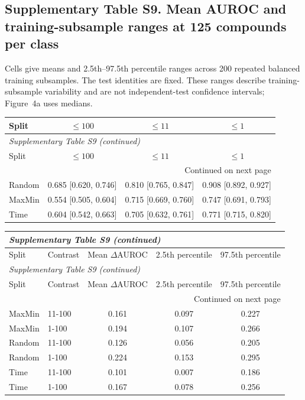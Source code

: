 \subsection*{Supplementary Table S9. Mean AUROC and training-subsample ranges at 125 compounds per class}
Cells give means and 2.5th--97.5th percentile ranges across 200 repeated balanced training subsamples. The test identities are fixed. These ranges describe training-subsample variability and are not independent-test confidence intervals; Figure~4a uses medians.
\begin{longtable}{lccc}

\toprule Split & $\leq100$ & $\leq11$ & $\leq1$ \\ \midrule\endfirsthead
\multicolumn{4}{l}{\textit{Supplementary Table S9 (continued)}} \\
\toprule Split & $\leq100$ & $\leq11$ & $\leq1$ \\ \midrule\endhead
\midrule\multicolumn{4}{r}{Continued on next page}\\\endfoot
\bottomrule\endlastfoot
Random & 0.685 [0.620, 0.746] & 0.810 [0.765, 0.847] & 0.908 [0.892, 0.927] \\
MaxMin & 0.554 [0.505, 0.604] & 0.715 [0.669, 0.760] & 0.747 [0.691, 0.793] \\
Time & 0.604 [0.542, 0.663] & 0.705 [0.632, 0.761] & 0.771 [0.715, 0.820] \\
\end{longtable}
\begin{longtable}{llccc}
\multicolumn{5}{l}{\textit{Supplementary Table S9 (continued)}} \\
\toprule Split & Contrast & Mean $\Delta$AUROC & 2.5th percentile & 97.5th percentile \\ \midrule\endfirsthead
\multicolumn{5}{l}{\textit{Supplementary Table S9 (continued)}} \\
\toprule Split & Contrast & Mean $\Delta$AUROC & 2.5th percentile & 97.5th percentile \\ \midrule\endhead
\midrule\multicolumn{5}{r}{Continued on next page}\\\endfoot
\bottomrule\endlastfoot
MaxMin & 11-100 & 0.161 & 0.097 & 0.227 \\
MaxMin & 1-100 & 0.194 & 0.107 & 0.266 \\
Random & 11-100 & 0.126 & 0.056 & 0.205 \\
Random & 1-100 & 0.224 & 0.153 & 0.295 \\
Time & 11-100 & 0.101 & 0.007 & 0.186 \\
Time & 1-100 & 0.167 & 0.078 & 0.256 \\
\end{longtable}

